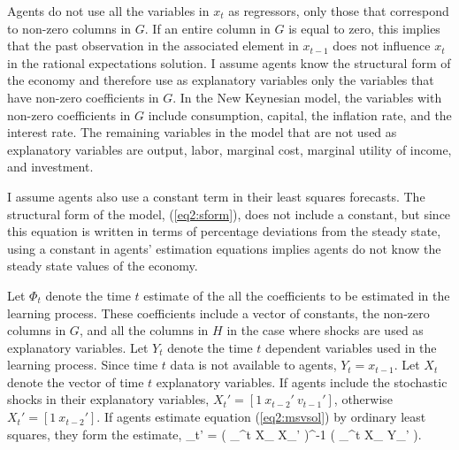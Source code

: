 Agents do not use all the variables in $x_t$ as regressors, only those that correspond to non-zero columns in $G$.  If an entire column in $G$ is equal to zero, this implies that the past observation in the associated element in $x_{t-1}$ does not influence $x_t$ in the rational expectations solution.  I assume agents know the structural form of the economy and therefore use as explanatory variables only the variables that have non-zero coefficients in $G$.  In the New Keynesian model, the variables with non-zero coefficients in $G$ include consumption, capital, the inflation rate, and the interest rate.  The remaining variables in the model that are not used as explanatory variables are output, labor, marginal cost, marginal utility of income, and investment.  

I assume agents also use a constant term in their least squares forecasts.  The structural form of the model, (\ref{eq2:sform}), does not include a constant, but since this equation is written in terms of percentage deviations from the steady state, using a constant in agents' estimation equations implies agents do not know the steady state values of the economy.

Let $\Phi_t$ denote the time $t$ estimate of the all the coefficients to be estimated in the learning process.  These coefficients include a vector of constants, the non-zero columns in $G$, and all the columns in $H$ in the case where shocks are used as explanatory variables.  Let $Y_t$ denote the time $t$ dependent variables used in the learning process.  Since time $t$ data is not available to agents, $Y_t = x_{t-1}$.  Let $X_t$ denote the vector of time $t$ explanatory variables.  If agents include the stochastic shocks in their explanatory variables, $X_t' = [1~ x_{t-2}'~ v_{t-1}']$, otherwise $X_t' = [1~ x_{t-2}']$.  If agents estimate equation (\ref{eq2:msvsol}) by ordinary least squares, they form the estimate,
\beq \label{eq2:Phi} \Phi_t' = \left(  \sum_{}^{t} X_{\tau} X_{\tau}' \right)^{-1} \left(  \sum_{}^{t} X_{\tau} Y_{\tau}' \right). \eeq 

